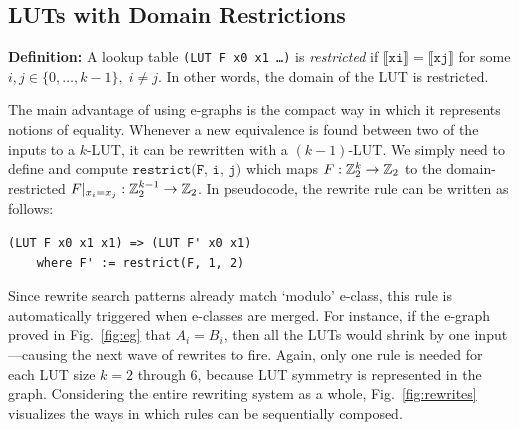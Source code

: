 \subsection{LUTs with Domain Restrictions}\label{sec:rewrites:restrict}

\textbf{Definition:} A lookup table \texttt{(LUT F x0 x1 \ldots)} is
\textit{restricted} if $\llbracket \texttt{xi} \rrbracket = \llbracket \texttt{xj} \rrbracket$
for some $ i, j \in \{0, \ldots, k-1\}, \; i \neq j$. In other words, the
domain of the LUT is restricted.

The main advantage of using e-graphs is the compact way in which it represents
notions of equality. Whenever a new equivalence is found between two of the
inputs to a $k$-LUT, it can be rewritten with a $(k-1)$-LUT. We simply need to
define and compute $\texttt{restrict(F, i, j)}$ which maps $F : \mathbb{Z}_{2}^{k}
    \rightarrow \mathbb{Z}_{2}$ to the domain-restricted $F \vert_{x_i = x_j} : \mathbb{Z}_{2}^{k-1}
    \rightarrow \mathbb{Z}_{2}$. In pseudocode, the rewrite rule can be written as follows:

\begin{lstlisting}
(LUT F x0 x1 x1) => (LUT F' x0 x1)
    where F' := restrict(F, 1, 2)
\end{lstlisting}

Since rewrite search patterns already match `modulo' e-class, this rule is
automatically triggered when e-classes are merged. For instance, if the e-graph
proved in Fig.~\ref{fig:eg} that $A_i = B_i$, then all the LUTs would shrink by
one input---causing the next wave of rewrites to fire. Again, only one rule is
needed for each LUT size $k=2$ through 6, because LUT symmetry is represented
in the graph. Considering the entire rewriting system as a whole,
Fig.~\ref{fig:rewrites} visualizes the ways in which rules can be sequentially
composed.

